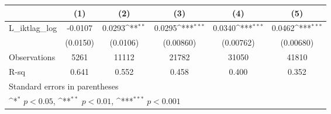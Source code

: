 {
\def\sym#1{\ifmmode^{#1}\else\(^{#1}\)\fi}
\begin{tabular}{l*{5}{c}}
\hline\hline
                &\multicolumn{1}{c}{(1)}         &\multicolumn{1}{c}{(2)}         &\multicolumn{1}{c}{(3)}         &\multicolumn{1}{c}{(4)}         &\multicolumn{1}{c}{(5)}         \\
\hline
L\_iktlag\_log    &  -0.0107         &   0.0293\sym{**} &   0.0295\sym{***}&   0.0340\sym{***}&   0.0462\sym{***}\\
                & (0.0150)         & (0.0106)         &(0.00860)         &(0.00762)         &(0.00680)         \\
\hline
Observations    &     5261         &    11112         &    21782         &    31050         &    41810         \\
R-sq            &    0.641         &    0.552         &    0.458         &    0.400         &    0.352         \\
\hline\hline
\multicolumn{6}{l}{\footnotesize Standard errors in parentheses}\\
\multicolumn{6}{l}{\footnotesize \sym{*} \(p<0.05\), \sym{**} \(p<0.01\), \sym{***} \(p<0.001\)}\\
\end{tabular}
}
